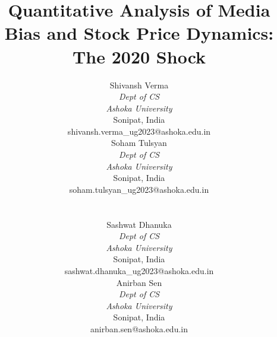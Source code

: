 \documentclass[conference]{IEEEtran}
\begin{document}
\title{Quantitative Analysis of Media Bias and Stock Price Dynamics: The 2020 Shock}

\author{\small
\begin{minipage}[t]{0.48\textwidth}
\centering
Shivansh Verma \\
\textit{Dept of CS} \\
\textit{Ashoka University} \\
Sonipat, India \\
shivansh.verma\_ug2023@ashoka.edu.in
\end{minipage}
\hfill
\begin{minipage}[t]{0.48\textwidth}
\centering
Soham Tulsyan \\
\textit{Dept of CS} \\
\textit{Ashoka University} \\
Sonipat, India \\
soham.tulsyan\_ug2023@ashoka.edu.in
\end{minipage}
\\[0.6em]
\begin{minipage}[t]{0.48\textwidth}
\centering
Sashwat Dhanuka \\
\textit{Dept of CS} \\
\textit{Ashoka University} \\
Sonipat, India \\
sashwat.dhanuka\_ug2023@ashoka.edu.in
\end{minipage}
\hfill
\begin{minipage}[t]{0.48\textwidth}
\centering
Anirban Sen \\
\textit{Dept of CS} \\
\textit{Ashoka University} \\
Sonipat, India \\
anirban.sen@ashoka.edu.in
\end{minipage}
}

\maketitle

\thispagestyle{empty}

\begin{abstract}
\end{abstract}

\end{document}
